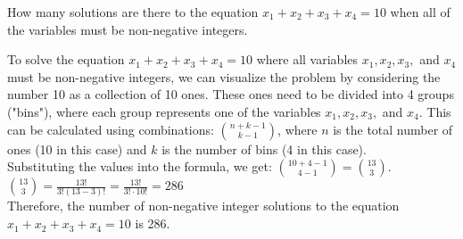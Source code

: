 \documentclass[solution,letterpaper]{cs20}
\begin{document}
\begin{problem}
    How many solutions are there to the equation $x_1+x_2+x_3+x_4=10$
    when all of the variables must be non-negative integers.

    \begin{solution}
        To solve the equation \( x_1 + x_2 + x_3 + x_4 = 10 \) where all variables \( x_1, x_2, x_3, \) and \( x_4 \) must be non-negative integers, we can visualize the problem by considering the number 10 as a collection of 10 ones. These ones need to be divided into 4 groups ("bins"), where each group represents one of the variables \( x_1, x_2, x_3, \) and \( x_4 \).
        This can be calculated using combinations: \( \binom{n + k - 1}{k - 1} \), where \( n \) is the total number of ones (10 in this case) and \( k \) is the number of bins (4 in this case). \\
        Substituting the values into the formula, we get: \( \binom{10 + 4 - 1}{4 - 1} = \binom{13}{3} \). \\
        \( \binom{13}{3} = \frac{13!}{3!(13-3)!} = \frac{13!}{3! \cdot 10!}  = 286\) \\
        Therefore, the number of non-negative integer solutions to the equation \( x_1 + x_2 + x_3 + x_4 = 10 \) is 286. \\
    \end{solution}
\end{problem}
\newpage
\end{document}
